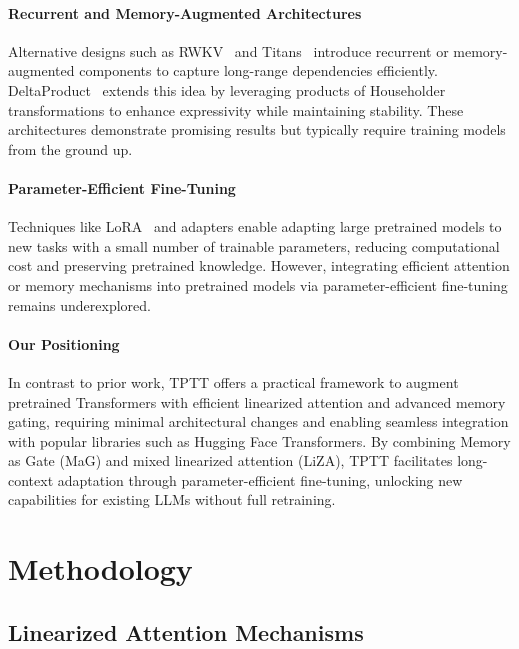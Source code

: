 \documentclass[10pt,a4paper]{article}
\begin{document}
\paragraph{Recurrent and Memory-Augmented Architectures}  
Alternative designs such as RWKV~\cite{chen2023rwkv} and Titans~\cite{behrouz2024titans} introduce recurrent or memory-augmented components to capture long-range dependencies efficiently. DeltaProduct~\cite{siems2025deltaproduct} extends this idea by leveraging products of Householder transformations to enhance expressivity while maintaining stability. These architectures demonstrate promising results but typically require training models from the ground up.

\paragraph{Parameter-Efficient Fine-Tuning}  
Techniques like LoRA~\cite{hu2022lora} and adapters enable adapting large pretrained models to new tasks with a small number of trainable parameters, reducing computational cost and preserving pretrained knowledge. However, integrating efficient attention or memory mechanisms into pretrained models via parameter-efficient fine-tuning remains underexplored.

\paragraph{Our Positioning}  
In contrast to prior work, TPTT offers a practical framework to augment pretrained Transformers with efficient linearized attention and advanced memory gating, requiring minimal architectural changes and enabling seamless integration with popular libraries such as Hugging Face Transformers. By combining Memory as Gate (MaG) and mixed linearized attention (LiZA), TPTT facilitates long-context adaptation through parameter-efficient fine-tuning, unlocking new capabilities for existing LLMs without full retraining.


\section{Methodology}

\subsection{Linearized Attention Mechanisms}
\end{document}
